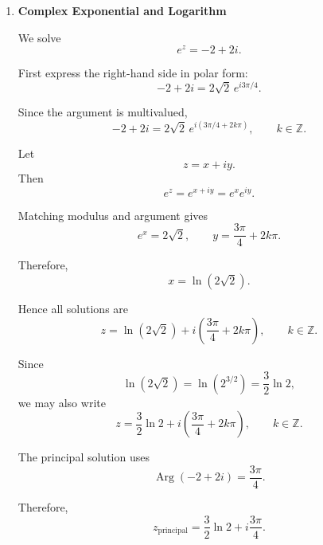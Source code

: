 \begin{enumerate}
    Adding both segments:
    \[
        \int_{C_2}\overline{z}\,dz
        =
        \frac12+\left(i+\frac12\right)
        =
        1+i.
    \]

    Since
    \[
        \int_{C_1}\overline{z}\,dz=1
    \]
    but
    \[
        \int_{C_2}\overline{z}\,dz=1+i,
    \]
    the integral depends on the path.

    Therefore, $\overline{z}$ does not have path-independent integrals.

    \item \textbf{Complex Exponential and Logarithm}

    We solve
    \[
        e^z=-2+2i.
    \]

    First express the right-hand side in polar form:
    \[
        -2+2i=2\sqrt{2}\,e^{i3\pi/4}.
    \]

    Since the argument is multivalued,
    \[
        -2+2i=2\sqrt{2}\,e^{i(3\pi/4+2k\pi)},
        \qquad k\in\mathbb{Z}.
    \]

    Let
    \[
        z=x+iy.
    \]
    Then
    \[
        e^z=e^{x+iy}=e^xe^{iy}.
    \]

    Matching modulus and argument gives
    \[
        e^x=2\sqrt{2},
        \qquad
        y=\frac{3\pi}{4}+2k\pi.
    \]

    Therefore,
    \[
        x=\ln(2\sqrt{2}).
    \]

    Hence all solutions are
    \[
        z=\ln(2\sqrt{2})+i\left(\frac{3\pi}{4}+2k\pi\right),
        \qquad k\in\mathbb{Z}.
    \]

    Since
    \[
        \ln(2\sqrt{2})
        =
        \ln(2^{3/2})
        =
        \frac32\ln 2,
    \]
    we may also write
    \[
        z=\frac32\ln 2+i\left(\frac{3\pi}{4}+2k\pi\right),
        \qquad k\in\mathbb{Z}.
    \]

    The principal solution uses
    \[
        \operatorname{Arg}(-2+2i)=\frac{3\pi}{4}.
    \]

    Therefore,
    \[
        z_{\text{principal}}=\frac32\ln 2+i\frac{3\pi}{4}.
    \]
\end{enumerate}
